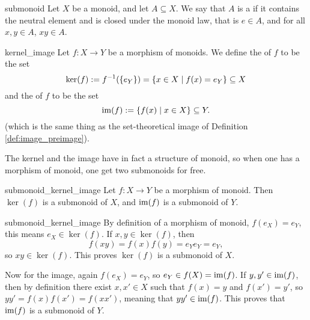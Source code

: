 \begin{cdef}{}{submonoid}
    Let \( X \) be a monoid, and let \( A \subseteq X \). We say that \( A \) is a  if it contains the neutral element and is closed under the monoid law, that is \( e \in A \), and for all \( x, y \in A \), \( xy \in A \).
\end{cdef}

\begin{cdef}{}{kernel_image}
    Let \( f : X \to Y \) be a morphism of monoids. We define the  of \( f \) to be the set
    \begin{equation*}
        \ker(f) := f^{-1}(\{ e_Y \}) = \{ x \in X \mid f(x) = e_Y \} \subseteq X
    \end{equation*}
    and the  of \( f \) to be the set
    \begin{equation*}
        \operatorname{im}(f) := \{ f(x) \mid x \in X \} \subseteq Y.
    \end{equation*}
    (which is the same thing as the set-theoretical image of Definition \ref{def:image_preimage}).
\end{cdef}

The kernel and the image have in fact a structure of monoid, so when one has a morphism of monoid, one get two submonoids for free.

\begin{clem}{}{submonoid_kernel_image}
    Let \( f : X \to Y  \) be a morphism of monoid. Then \( \ker(f) \) is a submonoid of \( X \), and \( \operatorname{im}(f) \) is a submonoid of \( Y \).
\end{clem}
\begin{lemproof}{submonoid_kernel_image}
    By definition of a morphism of monoid, \( f(e_X) = e_Y \), this means \( e_X \in \ker(f) \). If \( x, y \in \ker(f) \), then 
    \begin{equation*}
        f(xy) = f(x)f(y) = e_Ye_Y = e_Y,
    \end{equation*}
    so \( xy \in \ker(f) \). This proves \( \ker(f) \) is a submonoid of \( X \).

    Now for the image, again \( f(e_X) = e_Y \), so \( e_Y \in f(X) = \operatorname{im}(f) \). If \( y, y' \in \operatorname{im}(f) \), then by definition there exist \( x, x' \in X \) such that \( f(x) = y \) and \( f(x') = y' \), so \( yy' = f(x)f(x') = f(xx') \), meaning that \( yy' \in \operatorname{im}(f) \). This proves that \( \operatorname{im}(f) \) is a submonoid of \( Y \). 
\end{lemproof}

